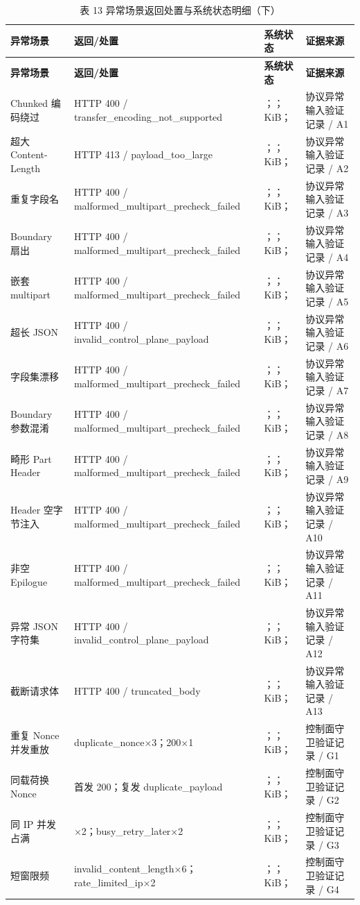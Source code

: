 \begin{longtable}{>{\raggedright\arraybackslash}p{}>{\raggedright\arraybackslash}p{}>{\raggedright\arraybackslash}p{}>{\raggedright\arraybackslash}p{}}
\caption{表 13 异常场景返回处置与系统状态明细（下）}\\
\toprule
\textbf{异常场景} & \textbf{返回/处置} & \textbf{系统状态} & \textbf{证据来源} \\
\midrule
\endfirsthead
\toprule
\textbf{异常场景} & \textbf{返回/处置} & \textbf{系统状态} & \textbf{证据来源} \\
\midrule
\endhead
Chunked 编码绕过 & HTTP 400 / transfer\_encoding\_not\_supported & ；；KiB； & 协议异常输入验证记录 / A1 \\
超大 Content-Length & HTTP 413 / payload\_too\_large & ；；KiB； & 协议异常输入验证记录 / A2 \\
重复字段名 & HTTP 400 / malformed\_multipart\_precheck\_failed & ；；KiB； & 协议异常输入验证记录 / A3 \\
Boundary 扇出 & HTTP 400 / malformed\_multipart\_precheck\_failed & ；；KiB； & 协议异常输入验证记录 / A4 \\
嵌套 multipart & HTTP 400 / malformed\_multipart\_precheck\_failed & ；；KiB； & 协议异常输入验证记录 / A5 \\
超长 JSON & HTTP 400 / invalid\_control\_plane\_payload & ；；KiB； & 协议异常输入验证记录 / A6 \\
字段集漂移 & HTTP 400 / malformed\_multipart\_precheck\_failed & ；；KiB； & 协议异常输入验证记录 / A7 \\
Boundary 参数混淆 & HTTP 400 / malformed\_multipart\_precheck\_failed & ；；KiB； & 协议异常输入验证记录 / A8 \\
畸形 Part Header & HTTP 400 / malformed\_multipart\_precheck\_failed & ；；KiB； & 协议异常输入验证记录 / A9 \\
Header 空字节注入 & HTTP 400 / malformed\_multipart\_precheck\_failed & ；；KiB； & 协议异常输入验证记录 / A10 \\
非空 Epilogue & HTTP 400 / malformed\_multipart\_precheck\_failed & ；；KiB； & 协议异常输入验证记录 / A11 \\
异常 JSON 字符集 & HTTP 400 / invalid\_control\_plane\_payload & ；；KiB； & 协议异常输入验证记录 / A12 \\
截断请求体 & HTTP 400 / truncated\_body & ；；KiB； & 协议异常输入验证记录 / A13 \\
重复 Nonce 并发重放 & duplicate\_nonce×3；200×1 & ；；KiB； & 控制面守卫验证记录 / G1 \\
同载荷换 Nonce & 首发 200；复发 duplicate\_payload & ；；KiB； & 控制面守卫验证记录 / G2 \\
同 IP 并发占满 & 200×2；busy\_retry\_later×2 & ；；KiB； & 控制面守卫验证记录 / G3 \\
短窗限频 & invalid\_content\_length×6；rate\_limited\_ip×2 & ；；KiB； & 控制面守卫验证记录 / G4 \\
\bottomrule
\end{longtable}

